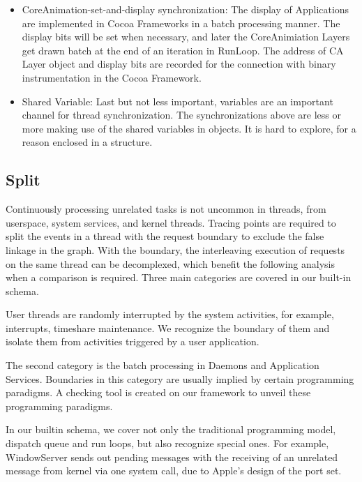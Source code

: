\begin{itemize}
        \item CoreAnimation-set-and-display synchronization: The display of
        Applications are implemented in Cocoa Frameworks in a batch processing
        manner. The display bits will be set when necessary, and later the
        CoreAnimiation Layers get drawn batch at the end of an iteration in
        RunLoop. The address of CA Layer object and display bits are recorded
        for the connection with binary instrumentation in the Cocoa Framework.

        \item Shared Variable: Last but not less important, variables are an
        important channel for thread synchronization. The synchronizations
        above are less or more making use of the shared variables in objects.
        It is hard to explore, for a reason enclosed in a structure.

\end{itemize}

\subsection{Split}                                                                                                       
Continuously processing unrelated tasks is not uncommon in threads, from userspace, system services, and kernel threads.
Tracing points are required to split the events in a thread with the request boundary to exclude the false linkage in the graph.
With the boundary, the interleaving execution of requests on the same thread can be decomplexed, which benefit the following analysis when a comparison is required.
Three main categories are covered in our built-in schema.
    
User threads are randomly interrupted by the system activities, for example,
interrupts, timeshare maintenance. We recognize the boundary of them and
isolate them from activities triggered by a user application.

The second category is the batch processing in Daemons and Application
Services. Boundaries in this category are usually implied by certain
programming paradigms. A checking tool is created on our framework to unveil
these programming paradigms.

In our builtin schema, we cover not only the traditional programming model,
dispatch queue and run loops, but also recognize special ones. For example,
WindowServer sends out pending messages with the receiving of an unrelated
message from kernel via one system call, due to Apple's design of the port set.

